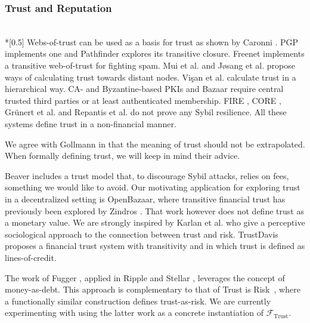 \subsubsection{Trust and Reputation} \ \\*[0.5\baselineskip]
  Webs-of-trust can be used as a basis for trust as shown by Caronni \cite{wot}. PGP
  \cite{pgp} implements one and Pathfinder \cite{pathfinder} explores its transitive
  closure. Freenet \cite{freenet} implements a transitive web-of-trust for fighting spam.
  Mui et al. \cite{mui} and J\o{}sang et al. \cite{beta} propose ways of calculating trust
  towards distant nodes.  Vi\c{s}an et al. \cite{vpc} calculate trust in a hierarchical
  way. CA- and Byzantine-based \cite{byzantine} PKIs \cite{pki} and Bazaar \cite{bazaar}
  require central trusted third parties or at least authenticated membership. FIRE
  \cite{fire}, CORE \cite{core}, Gr\"unert et al. \cite{ghkkw} and Repantis et al.
  \cite{rk} do not prove any Sybil resilience. All these systems define trust in a
  non-financial manner.

  We agree with Gollmann \cite{badtrust} in that the meaning of trust should not be
  extrapolated. When formally defining trust, we will keep in mind their advice.

  Beaver \cite{beaver} includes a trust model that, to discourage Sybil attacks, relies on
  fees, something we would like to avoid. Our motivating application for exploring trust
  in a decentralized setting is OpenBazaar, where transitive financial trust has
  previously been explored by Zindros \cite{dionyziz}. That work however does not define
  trust as a monetary value. We are strongly inspired by Karlan et al. \cite{kmrs} who
  give a perceptive sociological approach to the connection between trust and risk.
  TrustDavis \cite{davis} proposes a financial trust system with transitivity and in which
  trust is defined as lines-of-credit.

  The work of Fugger \cite{iou}, applied in Ripple \cite{ripple} and Stellar
  \cite{stellar}, leverages the concept of money-as-debt. This approach is complementary
  to that of Trust is Risk~\cite{trustisrisk}, where a functionally similar construction
  defines trust-as-risk. We are currently experimenting with using the latter work as a
  concrete instantiation of $\mathcal{F}_{\mathrm{Trust}}$.
